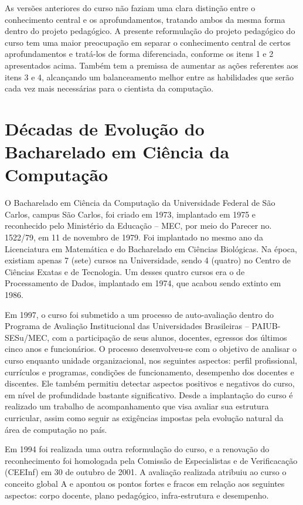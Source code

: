 As versões anteriores do curso não faziam uma clara distinção entre o conhecimento central e os aprofundamentos, tratando ambos da mesma forma dentro do projeto pedagógico. A presente reformulação do projeto pedagógico do curso tem uma maior preocupação em separar o conhecimento central de certos aprofundamentos e tratá-los de forma diferenciada, conforme os itens 1 e 2 apresentados acima. Também tem a premissa de aumentar as ações referentes aos itens 3 e 4, alcançando um balanceamento melhor entre as habilidades que serão cada vez mais necessárias para o cientista da computação.

\section{Décadas de Evolução do Bacharelado em Ciência da Computação }

O Bacharelado em Ciência da Computação da Universidade Federal de São Carlos, campus São Carlos, foi
criado em 1973, implantado em 1975 e reconhecido pelo Ministério da Educação – MEC, por meio do
Parecer no. 1522/79, em 11 de novembro de 1979.
Foi implantado no mesmo ano da Licenciatura em Matemática e do
Bacharelado em Ciências Biológicas. Na época, existiam apenas 7 (sete) cursos na Universidade,
sendo 4 (quatro) no Centro de Ciências Exatas e de Tecnologia. Um
desses quatro cursos era o de Processamento de Dados, implantado em 1974, que acabou sendo
extinto em 1986.

Em 1997, o curso foi submetido a um processo de auto-avaliação dentro do Programa de
Avaliação Institucional das Universidades Brasileiras – PAIUB-SESu/MEC, com a participação de
seus alunos, docentes, egressos dos últimos cinco anos e funcionários. O processo desenvolveu-se
com o objetivo de analisar o curso enquanto unidade organizacional, nos seguintes aspectos: perfil
profissional, currículos e programas, condições de funcionamento, desempenho dos docentes e
discentes. Ele também permitiu detectar aspectos positivos e negativos do curso, em nível de
profundidade bastante significativo.
Desde a implantação do curso é realizado um trabalho de acompanhamento que visa avaliar
sua estrutura curricular, assim como seguir as exigências impostas pela evolução natural da área de
computação no país. 

Em 1994 foi realizada uma outra reformulação do curso, e a renovação do reconhecimento foi homologada pela Comissão de
Especialistas e de Verificacação (CEEInf) em 30 de outubro de 2001. A avaliação realizada
atribuiu ao curso o conceito global A e apontou os pontos fortes e fracos em relação aos seguintes
aspectos: corpo docente, plano pedagógico, infra-estrutura e desempenho. 

